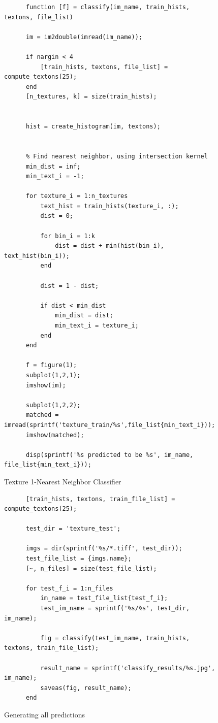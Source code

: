 \documentclass[11pt]{article}
\begin{document}
\begin{figure}[h!]
  \caption{Texture 1-Nearest Neighbor Classifier}
  \label{texton_classify}
  \centering
    \begin{lstlisting}
      function [f] = classify(im_name, train_hists, textons, file_list)

      im = im2double(imread(im_name));

      if nargin < 4
          [train_hists, textons, file_list] = compute_textons(25);
      end
      [n_textures, k] = size(train_hists);


      hist = create_histogram(im, textons);


      % Find nearest neighbor, using intersection kernel
      min_dist = inf;
      min_text_i = -1;

      for texture_i = 1:n_textures
          text_hist = train_hists(texture_i, :);
          dist = 0;

          for bin_i = 1:k
              dist = dist + min(hist(bin_i), text_hist(bin_i));
          end

          dist = 1 - dist;

          if dist < min_dist
              min_dist = dist;
              min_text_i = texture_i;
          end
      end

      f = figure(1);
      subplot(1,2,1);
      imshow(im);

      subplot(1,2,2);
      matched = imread(sprintf('texture_train/%s',file_list{min_text_i}));
      imshow(matched);

      disp(sprintf('%s predicted to be %s', im_name, file_list{min_text_i}));
    \end{lstlisting}
\end{figure}

\begin{figure}[h!]
  \caption{Generating all predictions}
  \label{texton_script}
  \centering
    \begin{lstlisting}
      [train_hists, textons, train_file_list] = compute_textons(25);

      test_dir = 'texture_test';

      imgs = dir(sprintf('%s/*.tiff', test_dir));
      test_file_list = {imgs.name};
      [~, n_files] = size(test_file_list);

      for test_f_i = 1:n_files
          im_name = test_file_list{test_f_i};
          test_im_name = sprintf('%s/%s', test_dir, im_name);

          fig = classify(test_im_name, train_hists, textons, train_file_list);

          result_name = sprintf('classify_results/%s.jpg', im_name);
          saveas(fig, result_name);
      end
    \end{lstlisting}
\end{figure}
\end{document}
